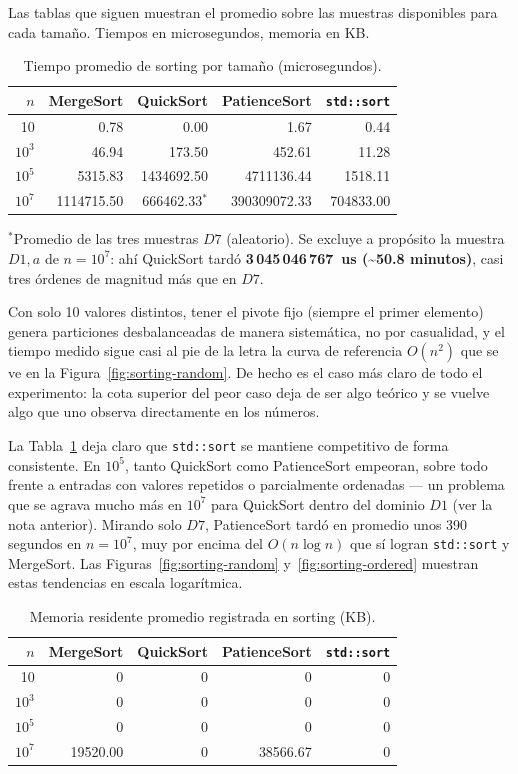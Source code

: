 Las tablas que siguen muestran el promedio sobre las muestras disponibles
para cada tamaño. Tiempos en microsegundos, memoria en KB.

\begin{table}[H]
\centering
\caption{Tiempo promedio de sorting por tamaño (microsegundos).}
\label{tab:sorting-times}
\begin{tabular}{r|rrrr}
\hline
$n$ & MergeSort & QuickSort & PatienceSort & \texttt{std::sort}\\
\hline
10 & 0.78 & 0.00 & 1.67 & 0.44\\
$10^3$ & 46.94 & 173.50 & 452.61 & 11.28\\
$10^5$ & 5315.83 & 1434692.50 & 4711136.44 & 1518.11\\
$10^7$ & 1114715.50 & 666462.33$^*$ & 390309072.33 & 704833.00\\
\hline
\end{tabular}
\end{table}

\noindent$^*$Promedio de las tres muestras $D7$ (aleatorio). Se excluye a
propósito la muestra $D1,a$ de $n=10^7$: ahí QuickSort tardó
\textbf{3\,045\,046\,767~us (\textasciitilde50.8 minutos)}, casi tres órdenes
de magnitud más que en $D7$.

Con solo 10 valores distintos, tener el pivote fijo (siempre el primer
elemento) genera particiones desbalanceadas de manera sistemática, no por
casualidad, y el tiempo medido sigue casi al pie de la letra la curva de
referencia $O(n^2)$ que se ve en la Figura~\ref{fig:sorting-random}. De hecho
es el caso más claro de todo el experimento: la cota superior del peor caso
deja de ser algo teórico y se vuelve algo que uno observa directamente en los
números.

La Tabla~\ref{tab:sorting-times} deja claro que \texttt{std::sort} se
mantiene competitivo de forma consistente. En $10^5$, tanto QuickSort como
PatienceSort empeoran, sobre todo frente a entradas con valores repetidos o
parcialmente ordenadas --- un problema que se agrava mucho más en $10^7$ para
QuickSort dentro del dominio $D1$ (ver la nota anterior). Mirando solo $D7$,
PatienceSort tardó en promedio unos 390 segundos en $n=10^7$, muy por encima
del $O(n\log n)$ que sí logran \texttt{std::sort} y MergeSort. Las
Figuras~\ref{fig:sorting-random} y~\ref{fig:sorting-ordered} muestran estas
tendencias en escala logarítmica.

\begin{table}[H]
\centering
\caption{Memoria residente promedio registrada en sorting (KB).}
\label{tab:sorting-memory}
\begin{tabular}{r|rrrr}
\hline
$n$ & MergeSort & QuickSort & PatienceSort & \texttt{std::sort}\\
\hline
10 & 0 & 0 & 0 & 0\\
$10^3$ & 0 & 0 & 0 & 0\\
$10^5$ & 0 & 0 & 0 & 0\\
$10^7$ & 19520.00 & 0 & 38566.67 & 0\\
\hline
\end{tabular}
\end{table}

